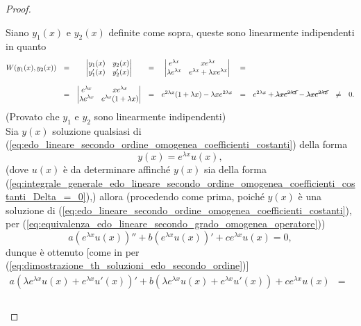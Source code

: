 \begin{proof}
\begin{enumerate}
		\noindent Siano $y_1(x)$ e $y_2(x)$ definite come sopra, queste sono linearmente indipendenti in quanto
		\begin{equation*}
			\begin{matrix}
				W(y_1(x),y_2(x)) &=&\begin{vmatrix}
					y_1(x) & y_2(x)\\
					y_1'(x) & y_2'(x)
				\end{vmatrix} &=&\begin{vmatrix}
					e^{\lambda x} & xe^{\lambda x}\\
					\lambda e^{\lambda x} & e^{\lambda  x} + \lambda x e^{\lambda x}
				\end{vmatrix} &=& \\\\
				&=&\begin{vmatrix}
					e^{\lambda x} & xe^{\lambda  x}\\
					\lambda  e^{\lambda x} &  e^{\lambda  x} (1 + \lambda x )
				\end{vmatrix} &=&
				 e^{2\lambda x}(1+\lambda x) - \lambda x e^{2\lambda x} &=& e^{2\lambda x} + \cancel{\lambda x e^{2\lambda x}} - \cancel{\lambda x e^{2\lambda x}} &\neq& 0.
			\end{matrix}
		\end{equation*}
		(Provato che $y_1$ e $y_2$ sono linearmente indipendenti)\\
		Sia $y(x)$ soluzione qualsiasi di (\ref{eq:edo_lineare_secondo_ordine_omogenea_coefficienti_costanti}) della forma 
		\begin{equation}\label{eq:integrale_generale_delta_=_0}
			y(x) = e^{\lambda x} u(x),
		\end{equation}
		(dove $u(x)$ è da determinare affinché $y(x)$ sia della forma (\ref{eq:integrale_generale_edo_lineare_secondo_ordine_omogenea_coefficienti_costanti_Delta_=_0}),) allora (procedendo come prima, poiché $y(x)$ è una soluzione di (\ref{eq:edo_lineare_secondo_ordine_omogenea_coefficienti_costanti}), per (\ref{eq:equivalenza_edo_lineare_secondo_grado_omogenea_operatore}))
		\begin{equation*}
			a(e^{\lambda x}u(x))'' + b(e^{\lambda x} u(x))' + c e^{\lambda x} u(x) = 0,
		\end{equation*}
		dunque è ottenuto [come in per (\ref{eq:dimostrazione_th_soluzioni_edo_secondo_ordine})]
		\begin{equation*}
			\begin{matrix}
				a(\lambda e^{\lambda x}u(x)+e^{\lambda x}u'(x))' + b(\lambda e^{\lambda x}u(x) + e^{\lambda x}u'(x)) + ce^{\lambda x}u(x) &=& \\\\

\end{matrix}
\end{equation*}
\end{enumerate}
\end{proof}
